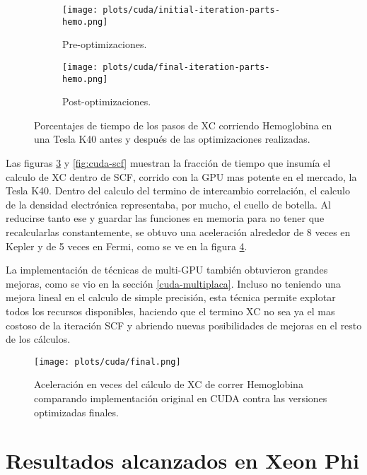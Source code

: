 \begin{figure}[htbp]
\centering
\begin{subfigure}[b]{\plotwidthtres}
   \texttt{[image: plots/cuda/initial-iteration-parts-hemo.png]}
   \caption{Pre-optimizaciones.}
   \label{fig:initial-cuda-parts}
 \end{subfigure}
 \begin{subfigure}[b]{\plotwidthtres}
   \texttt{[image: plots/cuda/final-iteration-parts-hemo.png]}
   \caption{Post-optimizaciones.}
   \label{fig:final-cuda-parts}
 \end{subfigure}
 \caption{Porcentajes de tiempo de los pasos de XC corriendo Hemoglobina en una Tesla K40 antes y despu\'es de
 las optimizaciones realizadas.}
 \label{fig:cuda-parts}
\end{figure}

Las figuras \ref{fig:cuda-parts} y \ref{fig:cuda-scf} muestran la fracci\'on de tiempo que insum\'ia el
calculo de XC dentro de SCF, corrido con la GPU mas potente en el mercado, la Tesla K40.
Dentro del calculo del termino de intercambio correlaci\'on, el calculo de la densidad electr\'onica
representaba, por mucho, el cuello de botella. Al reducirse tanto ese y guardar las funciones en
memoria para no tener que recalcularlas constantemente, se obtuvo una aceleraci\'on alrededor de 8
veces en Kepler y de 5 veces en Fermi, como se ve en la figura \ref{fig:cuda-final}.

La implementaci\'on de t\'ecnicas de multi-GPU tambi\'en obtuvieron grandes mejoras, como se vio en la
secci\'on \ref{cuda-multiplaca}. Incluso no teniendo una mejora lineal en el calculo de simple
precisi\'on, esta t\'ecnica permite explotar todos los recursos disponibles, haciendo que el termino
XC no sea ya el mas costoso de la iteraci\'on SCF y abriendo nuevas posibilidades de mejoras en el
resto de los c\'alculos.

\begin{figure}[htbp]
   \centering
   \texttt{[image: plots/cuda/final.png]}
   \caption{Aceleraci\'on en veces del c\'alculo de XC de correr Hemoglobina comparando implementaci\'on original en CUDA contra
   las versiones optimizadas finales.}
   \label{fig:cuda-final}
\end{figure}

\section{Resultados alcanzados en Xeon Phi}

